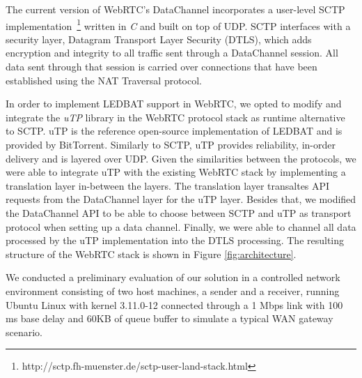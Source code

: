 \documentclass{sig-alternate}
\begin{document}
The current version of WebRTC's DataChannel incorporates a user-level SCTP
implementation~\footnote{http://sctp.fh-muenster.de/sctp-user-land-stack.html} written in
\textit{C} and built on top of UDP. SCTP interfaces with a security layer, Datagram
Transport Layer Security (DTLS), which adds encryption and integrity to all traffic sent
through a DataChannel session. All data sent through that session is carried over
connections that have been established using the NAT Traversal protocol.


In order to implement LEDBAT support in WebRTC, we opted to modify and integrate the
\textit{uTP} library \cite{utp-repo} in the WebRTC protocol stack as runtime alternative
to SCTP. uTP is the reference open-source implementation of LEDBAT and is provided by
BitTorrent. Similarly to SCTP, uTP provides reliability, in-order delivery and is layered
over UDP. Given the similarities between the protocols, we were able to integrate uTP with
the existing WebRTC stack by implementing a translation layer in-between the layers. The
translation layer transaltes API requests from the DataChannel layer for the uTP
layer. Besides that, we modified the DataChannel API to be able to choose between SCTP and
uTP as transport protocol when setting up a data channel. Finally, we were able to channel
all data processed by the uTP implementation into the DTLS processing. The resulting
structure of the WebRTC stack is shown in Figure \ref{fig:architecture}.

\label{sec:architecture}



We conducted a preliminary evaluation of our solution in a controlled network environment
consisting of two host machines, a sender and a receiver, running Ubuntu Linux with kernel
3.11.0-12 connected through a 1 Mbps link with 100 ms base delay and 60KB of queue
buffer to simulate a typical WAN gateway scenario.

%
\end{document}
